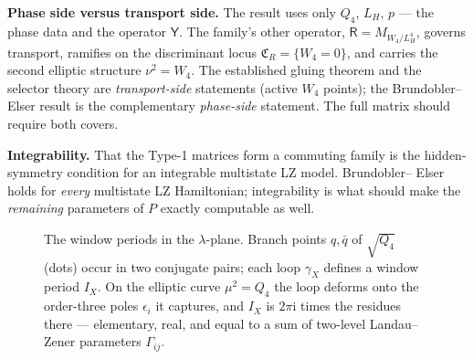 \documentclass[11pt]{article}
\newcommand{\ii}{\mathrm i}
\newcommand{\Res}{\operatorname{Res}}
\newcommand{\Yop}{\mathsf Y}
\newcommand{\Rop}{\mathsf R}
\newcommand{\re}{\operatorname{Re}}
\begin{document}
\textbf{Phase side versus transport side.} The result uses only $Q_4$, $L_H$,
$p$ --- the phase data and the operator $\Yop$. The family's other operator,
$\Rop=M_{W_4/L_H^4}$, governs transport, ramifies on the discriminant locus
$\mathfrak C_R=\{W_4=0\}$, and carries the second elliptic structure
$\nu^2=W_4$. The established gluing theorem and the selector theory are
\emph{transport-side} statements (active $W_4$ points); the Brundobler--Elser
result is the complementary \emph{phase-side} statement. The full matrix should
require both covers.

\textbf{Integrability.} That the Type-1 matrices form a commuting family is the
hidden-symmetry condition for an integrable multistate LZ model. Brundobler--
Elser holds for \emph{every} multistate LZ Hamiltonian; integrability is what
should make the \emph{remaining} parameters of $P$ exactly computable as well.

\begin{figure}[h]
\centering
{}
\caption{The window periods in the $\lambda$-plane. Branch points $q,\bar q$ of
$\sqrt{Q_4}$ (dots) occur in two conjugate pairs; each loop $\gamma_X$ defines a
window period $I_X$. On the elliptic curve $\mu^2=Q_4$ the loop deforms onto the
order-three poles $\epsilon_i$ it captures, and $I_X$ is $2\pi\ii$ times the
residues there --- elementary, real, and equal to a sum of two-level
Landau--Zener parameters $\Gamma_{ij}$.}
\end{figure}
\end{document}
